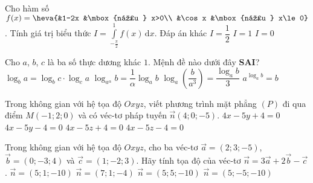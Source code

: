 \begin{ex}%
Cho hàm số $f(x)=\heva{&1-2x &\mbox{nếu } x>0\\ &\cos x &\mbox{nếu } x\le 0}$. Tính giá trị biểu thức $I=\displaystyle\int\limits_{-\frac{\pi}{2}}^1f(x)\mathrm{\,d}x$.
\choice
{Đáp án khác}
{$I=\dfrac{1}{2}$}
{\True $I=1$}
{$I=0$}
\end{ex}

\begin{ex}%
Cho $a$, $b$, $c$ là ba số thực dương khác $1$. Mệnh đề nào dưới đây {\bf SAI}?
\choice
{$\log_ba=\log_bc\cdot\log_ca$}
{$\log_{a^{\alpha}}b=\dfrac{1}{\alpha}\log_ab$}
{\True $\log_a\left(\dfrac{b}{a^3}\right)=\dfrac{\log_ab}{3}$}
{$a^{\log_ab}=b$}
\end{ex}

\begin{ex}%
Trong không gian với hệ tọa độ $Oxyz$, viết phương trình mặt phẳng $(P)$ đi qua điểm $M(-1;2;0)$ và có véc-tơ pháp tuyến $\overrightarrow{n}(4;0;-5)$.
\choice
{$4x-5y+4=0$}
{$4x-5y-4=0$}
{\True $4x-5z+4=0$}
{$4x-5z-4=0$}

\end{ex}

\begin{ex}%
Trong không gian với hệ tọa độ $Oxyz$, cho ba véc-tơ $\overrightarrow{a}=(2;3;-5)$, $\overrightarrow{b}=(0;-3;4)$ và $\overrightarrow{c}=(1;-2;3)$. Hãy tính tọa độ của véc-tơ $\overrightarrow{n}=3\overrightarrow{a}+2\overrightarrow{b}-\overrightarrow{c}$.
\choice
{$\overrightarrow{n}=(5;1;-10)$}
{$\overrightarrow{n}=(7;1;-4)$}
{\True $\overrightarrow{n}=(5;5;-10)$}
{$\overrightarrow{n}=(5;-5;-10)$}
\end{ex}

